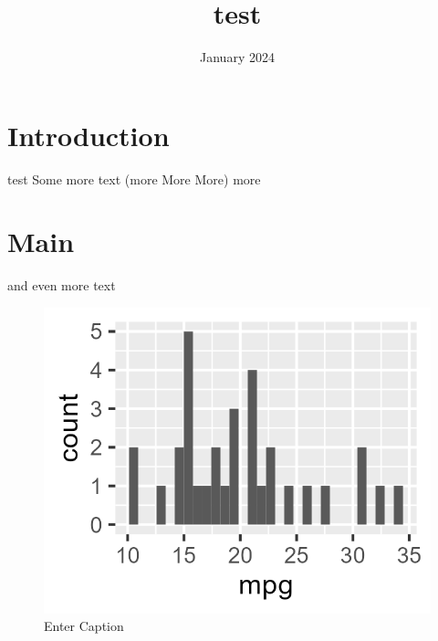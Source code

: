 \documentclass{article}
\title{test}
\author{ }
\date{January 2024}
\begin{document}
\maketitle

\section{Introduction}
test
Some more text (more More More)
more

\section{Main}
and even more text

\begin{figure}
    \centering
    \includegraphics[width=0.5\linewidth]{images/mtcars-histogram.png}
    \caption{Enter Caption}
    \label{fig:enter-label}
\end{figure}
\end{document}
